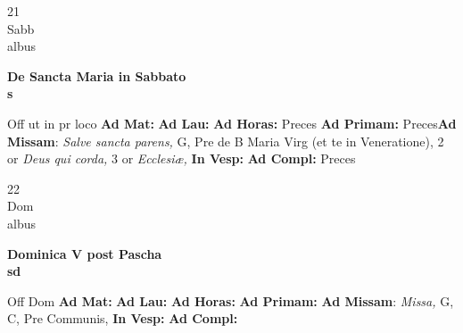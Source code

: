 \documentclass[10pt, openany]{book}
\begin{document}
        \begin{center}
            \begin{minipage}{3.5in}
                \vspace{2em}
                \begin{minipage}{0.5in}
                    {\Huge 21} \\
                    {\normalsize Sabb} \\
                    {\normalsize albus}
                \end{minipage}
                \begin{minipage}{3.0in}
                    \textbf{ \large De Sancta Maria in Sabbato \\
                    \textnormal{\normalsize s}} \\ 
                \end{minipage}
                \begin{justify}Off ut in pr loco
                    \textbf{Ad Mat: }
                    \textbf{Ad Lau: }
                    \textbf{Ad Horas: }Preces
                    \textbf{Ad Primam: }Preces\textbf{Ad Missam}: \textit{Salve sancta parens,} G, Pre de B Maria Virg (et te in Veneratione), 2 or \textit{Deus qui corda,} 3 or \textit{Ecclesiæ,}  
                    \textbf{In Vesp: }
                    \textbf{Ad Compl: }Preces
                \end{justify}
            \end{minipage}
        \end{center}
    
        \begin{center}
            \begin{minipage}{3.5in}
                \vspace{2em}
                \begin{minipage}{0.5in}
                    {\Huge 22} \\
                    {\normalsize Dom} \\
                    {\normalsize albus}
                \end{minipage}
                \begin{minipage}{3.0in}
                    \textbf{ \large Dominica V post Pascha \\
                    \textnormal{\normalsize sd}} \\ 
                \end{minipage}
                \begin{justify}Off Dom
                    \textbf{Ad Mat: }
                    \textbf{Ad Lau: }
                    \textbf{Ad Horas: }
                    \textbf{Ad Primam: }\textbf{Ad Missam}: \textit{Missa,} G, C, Pre Communis,  
                    \textbf{In Vesp: }
                    \textbf{Ad Compl: }
                \end{justify}
            \end{minipage}
        \end{center}
    
\end{document}
